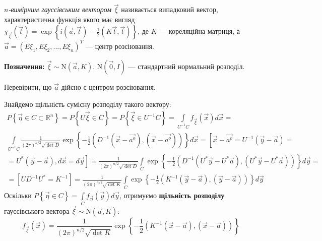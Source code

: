 \begin{definition}
    $n$\emph{-вимірним гауссівським вектором} $\vec{\xi}$ називається випадковий вектор,
    характеристична функція якого має вигляд $\chi_{\vec{\xi}}(\vec{t}) = \exp\left\{i(\vec{a}, \vec{t}) - \frac{1}{2}(K\vec{t}, \vec{t})\right\}$,
    де $K$ --- кореляційна матриця, а $\vec{a} = \left( E\xi_1, E\xi_2, ..., E\xi_n\right)^T$ --- центр розсіювання.
\end{definition}
\noindent \textbf{Позначення:} $\vec{\xi} \sim \mathrm{N}( \vec{a}, K)$. $\mathrm{N}( \vec{0}, {I})$ --- стандартний нормальний розподіл.
\begin{exercise}
    Перевірити, що $\vec{a}$ дійсно є центром розсіювання.
\end{exercise}
Знайдемо щільність сумісну розподілу такого вектору:
\begin{gather*}
    P\left\{\vec{\eta} \in C \subset \mathbb{R}^n\right\} = P\left\{U\vec{\xi}\in C\right\} = 
    P\left\{\vec{\xi}\in U^{-1}C\right\} = 
    \int\limits_{U^{-1}C} f_{\vec{\xi}}(\vec{x}) d\vec{x} = \\
    \int\limits_{U^{-1}C} \frac{1}{(2\pi)^{n/2} \sqrt{{\det{D}}}} \exp \left\{ -\frac{1}{2} \left( D^{-1}(\vec{x} - \vec{a^o}), (\vec{x} - \vec{a^o})\right)\right\} d\vec{x} =
    \left[ \vec{x} - \vec{a^o} = U^{-1}(\vec{y} - \vec{a}) = \right. \\ \left. = U^{*}(\vec{y} - \vec{a}), d\vec{x} = d\vec{y}\right] = 
    \frac{1}{(2\pi)^{n/2} \sqrt{{\det{D}}}} \int\limits_{C} \exp \left\{ -\frac{1}{2} \left( D^{-1}(U^{*}\vec{y} - U^{*}\vec{a}), (U^{*}\vec{y} - U^{*}\vec{a})\right)\right\} d\vec{y} = \\
    = \left[ UD^{-1}U^{*} = K^{-1}\right] =
    \frac{1}{(2\pi)^{n/2} \sqrt{{\det{K}}}} \int\limits_{C} \exp \left\{ -\frac{1}{2} \left( K^{-1}(\vec{y} - \vec{a}), (\vec{y} - \vec{a})\right)\right\} d\vec{y}
\end{gather*}
Оскільки $P\left\{\vec{\eta} \in C\right\} = \int\limits_{C} f_{\vec{\eta}}(\vec{y}) d\vec{y}$,
отримуємо \textbf{щільність розподілу} гауссівського вектора $\vec{\xi} \sim \mathrm{N}(\vec{a}, K)$:
\begin{equation}
    f_{\vec{\xi}}(\vec{x}) = \frac{1}{(2\pi)^{n/2} \sqrt{{\det{K}}}} \exp \left\{ -\frac{1}{2} \left( K^{-1}(\vec{x} - \vec{a}), (\vec{x} - \vec{a})\right)\right\}
\end{equation}

